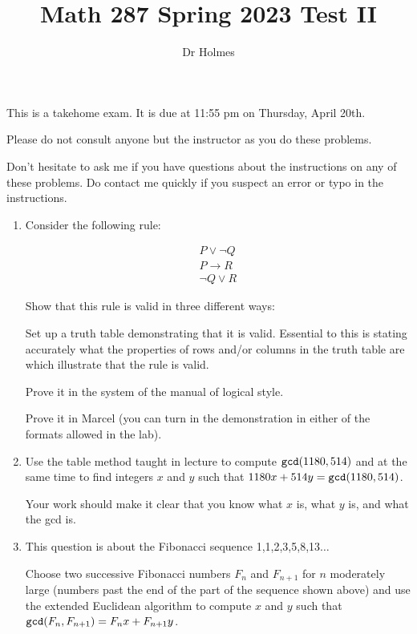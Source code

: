 \documentclass[12pt]{article}
\title{Math 287 Spring 2023 Test II}
\author{Dr Holmes}
\begin{document}
\maketitle

This is a takehome exam.  It is due at 11:55 pm on Thursday, April  20th.

Please do not consult anyone but the instructor as you do these problems.

Don't hesitate to ask me if you have questions about the instructions on any of these problems.  Do contact me quickly if you suspect an error or typo in the instructions.

\newpage

\begin{enumerate}

\item  Consider the following rule:

$$\begin{array}{c}

P \vee \neg Q \\

P \rightarrow R \\ \hline

\neg Q \vee R

\end{array}$$

Show that this rule is valid in three different ways:

Set up a truth table demonstrating that it is valid.  Essential to this is stating accurately what the properties of rows and/or columns in the truth
table are which illustrate that the rule is valid.

Prove it in the system of the manual of logical style.

Prove it in Marcel (you can turn in the demonstration in either of the formats allowed in the lab).

\newpage

\item  Use the table method taught in lecture to compute ${\tt gcd}(1180,514)$ and at the same time to find integers $x$ and $y$ such that
$1180x + 514y = {\tt gcd}(1180,514)$.

Your work should make it clear that you know what $x$ is, what $y$ is, and what the gcd is.

\newpage

\item  This question is about the Fibonacci sequence 1,1,2,3,5,8,13$\ldots$

Choose two successive Fibonacci numbers $F_n$ and $F_{n+1}$ for $n$ moderately large (numbers past the end of the part of the sequence shown above) and use the extended Euclidean algorithm to compute $x$ and $y$ such that ${\tt gcd}(F_n,F_{n+1}) = F_nx + F_{n+1}y$.


\end{enumerate}
\end{document}
